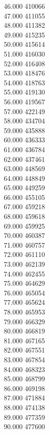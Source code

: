 { 46.000	410066 \\
 47.000	411055 \\
 48.000	411382 \\
 49.000	415235 \\
 50.000	415614 \\
 51.000	416030 \\
 52.000	416408 \\
 53.000	418476 \\
 54.000	418763 \\
 55.000	419130 \\
 56.000	419567 \\
 57.000	422149 \\
 58.000	434704 \\
 59.000	435888 \\
 60.000	436333 \\
 61.000	436784 \\
 62.000	437461 \\
 63.000	448569 \\
 64.000	448849 \\
 65.000	449259 \\
 66.000	455105 \\
 67.000	459218 \\
 68.000	459618 \\
 69.000	459925 \\
 70.000	460387 \\
 71.000	460757 \\
 72.000	461110 \\
 73.000	462139 \\
 74.000	462455 \\
 75.000	464629 \\
 76.000	465054 \\
 77.000	465624 \\
 78.000	465953 \\
 79.000	466329 \\
 80.000	466819 \\
 81.000	467165 \\
 82.000	467551 \\
 83.000	467854 \\
 84.000	468323 \\
 85.000	468799 \\
 86.000	469198 \\
 87.000	471884 \\
 88.000	474138 \\
 89.000	477359 \\
 90.000	477600 \\
}
